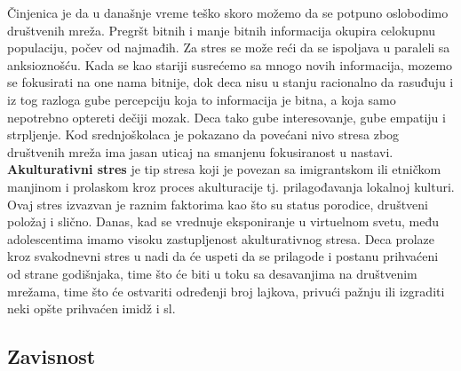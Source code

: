 \documentclass[a4paper]{article}
\begin{document}
{		Činjenica je da u današnje vreme teško skoro možemo da se potpuno oslobodimo društvenih mreža. Pregršt bitnih i manje bitnih informacija okupira celokupnu populaciju, počev od najmađih. Za stres se može reći da se ispoljava u paraleli sa anksioznošću. Kada se kao stariji susrećemo sa mnogo novih informacija, mozemo se fokusirati na one nama bitnije, dok deca nisu u stanju racionalno da rasuđuju i iz tog razloga gube percepciju koja to informacija je bitna, a koja samo nepotrebno optereti dečiji mozak. Deca tako gube interesovanje, gube empatiju i strpljenje. Kod srednjoškolaca je pokazano da povećani nivo stresa zbog društvenih mreža ima jasan uticaj na smanjenu fokusiranost u nastavi.\\
		\textbf{Akulturativni stres} je tip stresa koji je povezan sa imigrantskom ili etničkom manjinom i prolaskom kroz proces akulturacije tj. prilagođavanja lokalnoj kulturi. Ovaj stres izvazvan je raznim faktorima kao što su status porodice, društveni položaj i slično. Danas, kad se vrednuje eksponiranje u virtuelnom svetu, među adolescentima imamo visoku zastupljenost akulturativnog stresa. Deca prolaze kroz svakodnevni stres u nadi da će uspeti da se prilagode i postanu prihvaćeni od strane godišnjaka, time što će biti u toku sa desavanjima na društvenim mrežama, time što će ostvariti određenji broj lajkova, privući pažnju ili izgraditi neki opšte prihvaćen imidž i sl.
		
		\subsection{Zavisnost}
		
}
\end{document}
